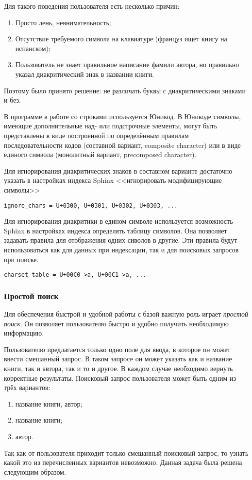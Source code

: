 Для такого поведения пользователя есть несколько причин:
\begin{enumerate}
    \item Просто лень, невнимательность;
    \item Отсутствие требуемого символа на клавиатуре (француз ищет книгу на испанском);
    \item Пользователь не знает правильное написание фамили автора, но правильно указал диакритический знак в названии книги.
\end{enumerate}

Поэтому было принято решение: не различать буквы с диакритическими знаками и без.

В программе в работе со строками используется Юникод.
В Юникоде символы, имеющие дополнительные над- или подстрочные элементы, 
могут быть представлены в виде построенной по определённым правилам последовательности кодов (составной вариант, composite character) \cite{compositechar} 
или в виде единого символа (монолитный вариант, precomposed character).

Для игнорирования диакритических знаков в составном варианте достаточно указать в настройках индекса Sphinx <<игнорировать модифицирующие символы>>
\begin{verbatim}
ignore_chars = U+0300, U+0301, U+0302, U+0303, ...
\end{verbatim}
Для игнорирования диакритики в едином символе используется возможность Sphinx в настройках индекса определять таблицу символов. Она позволяет задавать правила для отображения одних сиволов в другие.
Эти правила будут использоваться как для данных при индексации, так и для поисковых запросов при поиске.
\begin{verbatim}
charset_table = U+00C0->a, U+00C1->a, ...
\end{verbatim}

\subsubsection{Простой поиск}

Для обеспечения быстрой и удобной работы с базой важную роль играет {\em простой поиск}.
Он позволяет пользователю быстро и удобно получить необходимую информацию.

Пользователю предлагается только одно поле для ввода, в которое он может ввести смешанный запрос.
В таком запросе он может указать как и название книги, так и автора, так и то и другое.
В каждом случае необходимо вернуть корректные результаты.
Поисковый запрос пользователя может быть одним из трёх вариантов:
\begin{enumerate}
	\item название книги, автор;
	\item название книги;
	\item автор.
\end{enumerate}
Так как от пользователя приходит только смешанный поисковый запрос, то узнать какой это из перечисленных вариантов невозможно.
Данная задача была решена следующим образом.

